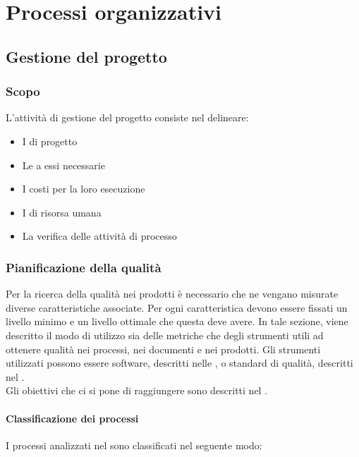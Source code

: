 \section{Processi organizzativi}

    \subsection{Gestione del progetto}\label{GestioneProgetto}

	    \subsubsection{Scopo}
	    L'attività di gestione del progetto consiste nel delineare:
	    \begin{itemize}
	    	\item I  di progetto
	    	\item Le  a essi necessarie
	    	\item I costi per la loro esecuzione
	    	\item I  di risorsa umana
	    	\item La verifica delle attività di processo
	    \end{itemize}

        \subsubsection{Pianificazione della qualità}\label{PianificazioneQualità}
        Per la ricerca della qualità nei prodotti è necessario che ne vengano misurate diverse caratteristiche associate.
        Per ogni caratteristica devono essere fissati un livello minimo e un livello ottimale che questa deve avere.
        In tale sezione, viene descritto il modo di utilizzo sia delle metriche che degli strumenti utili ad ottenere qualità nei processi, nei documenti e nei prodotti.
        Gli strumenti utilizzati possono essere software, descritti nelle \Doc{\NdPv}, o standard di qualità, descritti nel \Doc{\PdQv}.\\
        Gli obiettivi che ci si pone di raggiungere sono descritti nel \Doc{\PdQv}.

        \paragraph{Classificazione dei processi}
        I processi analizzati nel \Doc{\PdQv} sono classificati nel seguente modo:

